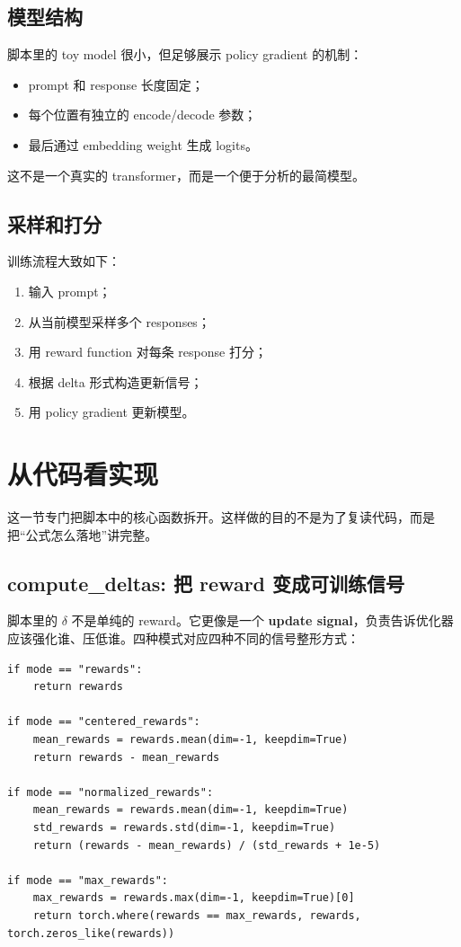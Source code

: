 \documentclass[a4paper]{article}
\begin{document}
\subsection{模型结构}

脚本里的 toy model 很小，但足够展示 policy gradient 的机制：
\begin{itemize}
    \item prompt 和 response 长度固定；
    \item 每个位置有独立的 encode/decode 参数；
\item 最后通过 embedding weight 生成 logits。
\end{itemize}

这不是一个真实的 transformer，而是一个便于分析的最简模型。


\subsection{采样和打分}

训练流程大致如下：
\begin{enumerate}
    \item 输入 prompt；
    \item 从当前模型采样多个 responses；
    \item 用 reward function 对每条 response 打分；
    \item 根据 delta 形式构造更新信号；
    \item 用 policy gradient 更新模型。
\end{enumerate}

\section{从代码看实现}

这一节专门把脚本中的核心函数拆开。这样做的目的不是为了复读代码，而是把“公式怎么落地”讲完整。

\subsection{compute\_deltas: 把 reward 变成可训练信号}

脚本里的 $\delta$ 不是单纯的 reward。它更像是一个 \textbf{update signal}，负责告诉优化器应该强化谁、压低谁。四种模式对应四种不同的信号整形方式：

\begin{lstlisting}[caption={compute\_deltas: reward to update signal}]
if mode == "rewards":
    return rewards

if mode == "centered_rewards":
    mean_rewards = rewards.mean(dim=-1, keepdim=True)
    return rewards - mean_rewards

if mode == "normalized_rewards":
    mean_rewards = rewards.mean(dim=-1, keepdim=True)
    std_rewards = rewards.std(dim=-1, keepdim=True)
    return (rewards - mean_rewards) / (std_rewards + 1e-5)

if mode == "max_rewards":
    max_rewards = rewards.max(dim=-1, keepdim=True)[0]
    return torch.where(rewards == max_rewards, rewards, torch.zeros_like(rewards))
\end{lstlisting}
\end{document}
